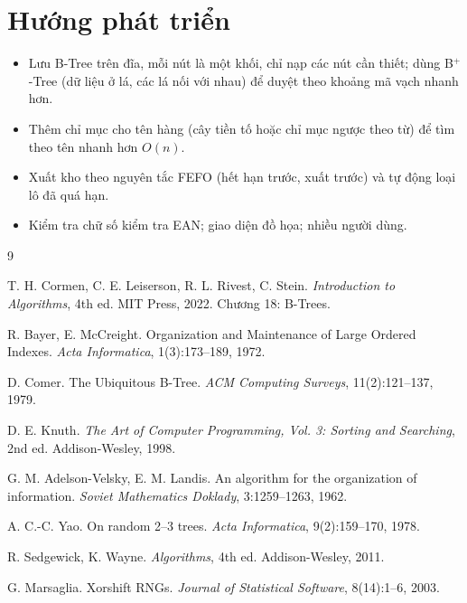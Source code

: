 \section{Hướng phát triển}

\begin{itemize}
  \item Lưu B-Tree trên đĩa, mỗi nút là một khối, chỉ nạp các nút cần thiết; dùng B$^+$-Tree (dữ liệu ở lá, các lá
        nối với nhau) để duyệt theo khoảng mã vạch nhanh hơn.
  \item Thêm chỉ mục cho tên hàng (cây tiền tố hoặc chỉ mục ngược theo từ) để tìm theo tên nhanh hơn $O(n)$.
  \item Xuất kho theo nguyên tắc FEFO (hết hạn trước, xuất trước) và tự động loại lô đã quá hạn.
  \item Kiểm tra chữ số kiểm tra EAN; giao diện đồ họa; nhiều người dùng.
\end{itemize}

\begingroup
\renewcommand{\chapter}[2]{\section*{#2}}
\makeatletter\let\@mkboth\@gobbletwo\makeatother   %
\small
\begin{thebibliography}{9}
\setlength{\itemsep}{1pt}

 T. H. Cormen, C. E. Leiserson, R. L. Rivest, C. Stein.
  \emph{Introduction to Algorithms}, 4th ed. MIT Press, 2022. Chương 18: B-Trees.

 R. Bayer, E. McCreight. Organization and Maintenance of Large Ordered Indexes.
  \emph{Acta Informatica}, 1(3):173--189, 1972.

 D. Comer. The Ubiquitous B-Tree. \emph{ACM Computing Surveys}, 11(2):121--137, 1979.

 D. E. Knuth. \emph{The Art of Computer Programming, Vol. 3: Sorting and Searching}, 2nd ed.
  Addison-Wesley, 1998.

 G. M. Adelson-Velsky, E. M. Landis. An algorithm for the organization of information.
  \emph{Soviet Mathematics Doklady}, 3:1259--1263, 1962.

 A. C.-C. Yao. On random 2--3 trees. \emph{Acta Informatica}, 9(2):159--170, 1978.

 R. Sedgewick, K. Wayne. \emph{Algorithms}, 4th ed. Addison-Wesley, 2011.

 G. Marsaglia. Xorshift RNGs. \emph{Journal of Statistical Software}, 8(14):1--6, 2003.

\end{thebibliography}
\endgroup
